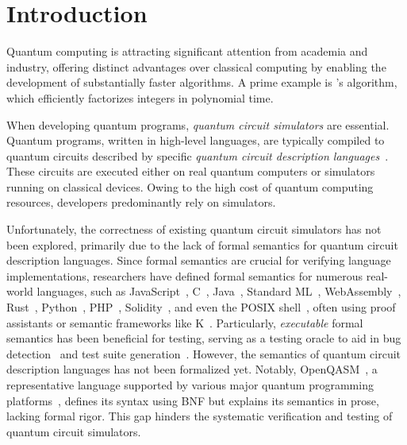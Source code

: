 
\chapter{Introduction}
\label{ch:intro}
\noindent
Quantum computing is attracting significant attention from academia and
industry, offering distinct advantages over classical computing by enabling the
development of substantially faster algorithms.
%
A prime example is \citet{shor1994algorithms}'s algorithm, which efficiently
factorizes integers in polynomial time.

When developing quantum programs, \emph{quantum circuit simulators} are
essential.
%
Quantum programs, written in high-level languages, are typically compiled to
quantum circuits described by specific \emph{quantum circuit description
	languages}~\cite{wang2022qdiff, paltenghi2023morphq}.
%
These circuits are executed either on real quantum computers or simulators
running on classical devices.
%
Owing to the high cost of quantum computing resources, developers predominantly
rely on simulators.

Unfortunately, the correctness of existing quantum circuit simulators has not
been explored, primarily due to the lack of formal semantics for quantum
circuit description languages.
%
Since formal semantics are crucial for verifying language implementations,
researchers have defined formal semantics for numerous real-world languages,
such as
%
JavaScript~\cite{maffeis2008operational,guha2010essence,politz2012tested,bodin2014trusted,park2015kjs,park2021jiset},
%
C~\cite{blazy2009mechanized,leroy2009formal,ellison2012executable,krebbers2014formal,memarian2016depths},
%
Java~\cite{farzan2004formal,klein2006machine,bogdanas2015kjava},
%
Standard ML~\cite{kumar2014cakeml,lee2007towards},
%
WebAssembly~\cite{watt2018mechanising,watt2021two},
%
Rust~\cite{jung2017rustbelt},
%
Python~\cite{politz2013python},
%
PHP~\cite{filaretti2014executable},
%
Solidity~\cite{jiao2020semantic},
%
and even the POSIX shell~\cite{greenberg2019executable},
%
often using proof assistants or semantic frameworks like
K~\cite{rosu2010overview}.
%
Particularly, \emph{executable} formal semantics has been beneficial for
testing, serving as a testing oracle to aid in bug
detection~\cite{watt2023wasmref,schumi2021spectest,park2021jest} and test suite
generation~\cite{park2023feature}.
%
However, the semantics of quantum circuit description languages has not been
formalized yet.
%
Notably, OpenQASM~\cite{cross2017open}, a representative language supported by
various major quantum programming platforms~\cite{qiskit, cirq, q-sharp},
defines its syntax using BNF but explains its semantics in prose, lacking
formal rigor.
%
This gap hinders the systematic verification and testing of quantum circuit
simulators.

